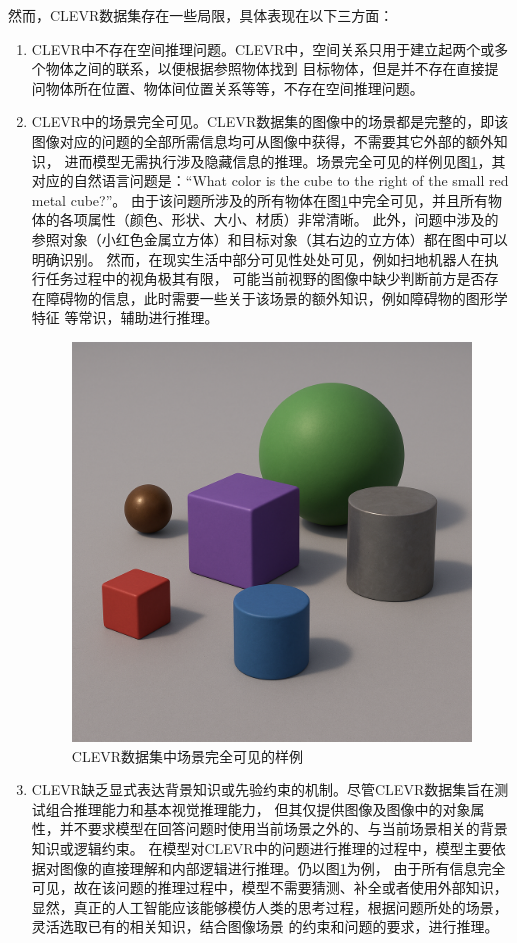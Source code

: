 然而，CLEVR数据集存在一些局限，具体表现在以下三方面：
\begin{enumerate}[nosep]
\item CLEVR中不存在空间推理问题。CLEVR中，空间关系只用于建立起两个或多个物体之间的联系，以便根据参照物体找到
目标物体，但是并不存在直接提问物体所在位置、物体间位置关系等等，不存在空间推理问题。
\item CLEVR中的场景完全可见。CLEVR数据集的图像中的场景都是完整的，即该图像对应的问题的全部所需信息均可从图像中获得，不需要其它外部的额外知识，
进而模型无需执行涉及隐藏信息的推理。场景完全可见的样例见图\ref{observable}，其对应的自然语言问题是：“What color is the cube to the right of the small red metal cube?”。
由于该问题所涉及的所有物体在图\ref{observable}中完全可见，并且所有物体的各项属性（颜色、形状、大小、材质）非常清晰。
此外，问题中涉及的参照对象（小红色金属立方体）和目标对象（其右边的立方体）都在图中可以明确识别。
然而，在现实生活中部分可见性处处可见，例如扫地机器人在执行任务过程中的视角极其有限，
可能当前视野的图像中缺少判断前方是否存在障碍物的信息，此时需要一些关于该场景的额外知识，例如障碍物的图形学特征
等常识，辅助进行推理。
\begin{figure}[h]
    \centering
    \includegraphics[scale=0.2]{figures/observable.png}
    \caption{CLEVR数据集中场景完全可见的样例}
    \label{observable}
\end{figure}
\item CLEVR缺乏显式表达背景知识或先验约束的机制。尽管CLEVR数据集旨在测试组合推理能力和基本视觉推理能力，
但其仅提供图像及图像中的对象属性，并不要求模型在回答问题时使用当前场景之外的、与当前场景相关的背景知识或逻辑约束。
在模型对CLEVR中的问题进行推理的过程中，模型主要依据对图像的直接理解和内部逻辑进行推理。仍以图\ref{observable}为例，
由于所有信息完全可见，故在该问题的推理过程中，模型不需要猜测、补全或者使用外部知识，
显然，真正的人工智能应该能够模仿人类的思考过程，根据问题所处的场景，灵活选取已有的相关知识，结合图像场景
的约束和问题的要求，进行推理。
\end{enumerate}
